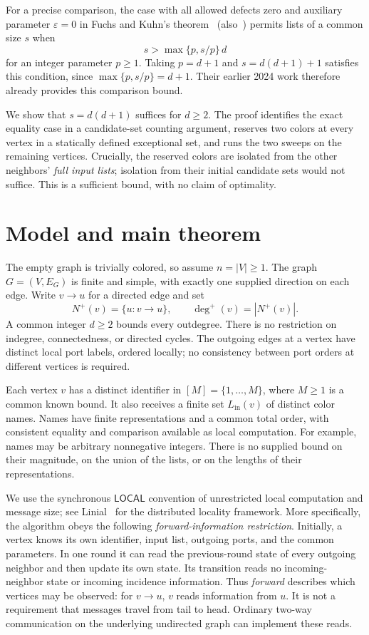 \documentclass[11pt,a4paper]{article}
\numberwithin{equation}{section}
\newcommand{\Nout}{N^{+}}
\newcommand{\Lin}{L_{\mathrm{in}}}
\newcommand{\outdeg}{\deg^{+}}
\newcommand{\LOCAL}{\mathsf{LOCAL}}
\begin{document}
For a precise comparison, the case with all allowed defects zero
and auxiliary parameter \(\varepsilon=0\) in
Fuchs and Kuhn's theorem~\cite[Theorem~1.1]{FK24}
(also~\cite[Theorem~2.1]{FK26}) permits lists of a common size \(s\)
when
\[
 s>\max\{p,s/p\}\,d
\]
for an integer parameter \(p\geq1\). Taking \(p=d+1\) and
\(s=d(d+1)+1\) satisfies this condition, since
\(\max\{p,s/p\}=d+1\). Their earlier 2024 work therefore already
provides this comparison bound.

We show that \(s=d(d+1)\) suffices for \(d\geq2\).
The proof identifies the exact equality case in a candidate-set
counting argument, reserves two colors at every vertex in a
statically defined exceptional set, and runs the two sweeps on the
remaining vertices. Crucially, the reserved colors are isolated
from the other neighbors' \emph{full input lists}; isolation from
their initial candidate sets would not suffice.
This is a sufficient bound, with no claim of optimality.

\section{Model and main theorem}
\label{sec:model}

The empty graph is trivially colored, so assume \(n=|V|\geq1\).
The graph \(G=(V,E_G)\) is finite and simple, with exactly one supplied
direction on each edge. Write \(v\to u\) for a directed edge and set
\[
 \Nout(v)=\{u:v\to u\},\qquad
 \outdeg(v)=|\Nout(v)|.
\]
A common integer \(d\geq2\) bounds every outdegree. There is no
restriction on indegree, connectedness, or directed cycles. The
outgoing edges at a vertex have distinct local port labels, ordered
locally; no consistency between port orders at different vertices is
required.

Each vertex \(v\) has a distinct identifier in
\([M]=\{1,\ldots,M\}\), where \(M\geq1\) is a common known bound.
It also receives a finite set \(\Lin(v)\) of distinct color names.
Names have finite representations and a common total order, with
consistent equality and comparison available as local computation.
For example, names may be arbitrary nonnegative integers. There is
no supplied bound on their magnitude, on the union of the lists, or on
the lengths of their representations.

We use the synchronous \(\LOCAL\) convention of unrestricted local
computation and message size; see Linial~\cite{Linial92} for the
distributed locality framework. More specifically, the algorithm
obeys the following \emph{forward-information restriction}.
Initially, a vertex knows its own identifier, input list, outgoing
ports, and the common parameters. In one round it can read the
previous-round state of every outgoing neighbor and then update its
own state. Its transition reads no incoming-neighbor state or incoming
incidence information. Thus \emph{forward} describes which vertices may
be observed: for \(v\to u\), \(v\) reads information from \(u\).
It is not a requirement that messages travel from tail to head.
Ordinary two-way communication on the underlying undirected graph
can implement these reads.
\end{document}
